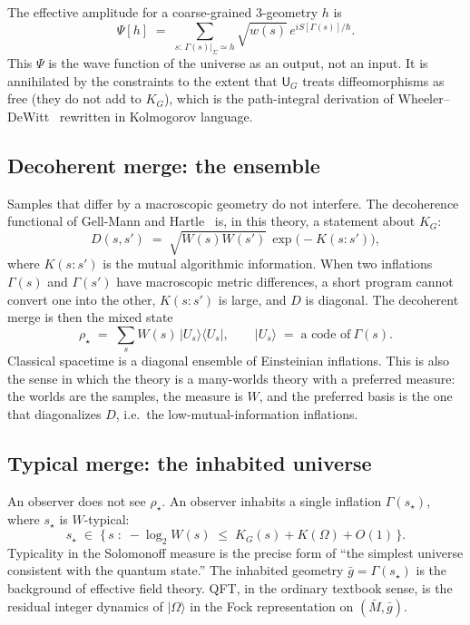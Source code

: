 \documentclass[11pt,a4paper]{article}
\theoremstyle{plain}
\theoremstyle{definition}
\theoremstyle{remark}
\newcommand{\KG}{K_{G}}
\newcommand{\UTM}{\mathsf{U}_{G}}
\newcommand{\ket}[1]{\lvert#1\rangle}
\newcommand{\bra}[1]{\langle#1\rvert}
\begin{document}
The effective amplitude for a coarse-grained $3$-geometry $h$ is
\begin{equation}
  \Psi[h] \;=\; \sum_{s:\,\Gamma(s)|_{\Sigma}\simeq h} \sqrt{w(s)}\, e^{iS[\Gamma(s)]/\hbar}.
  \label{eq:Psi}
\end{equation}
This $\Psi$ is the wave function of the universe as an output, not an input.
It is annihilated by the constraints to the extent that $\UTM$ treats diffeomorphisms as free (they do not add to $\KG$), which is the path-integral derivation of Wheeler--DeWitt~\cite{halliwell1991} rewritten in Kolmogorov language.

\subsection{Decoherent merge: the ensemble}

Samples that differ by a macroscopic geometry do not interfere.
The decoherence functional of Gell-Mann and Hartle~\cite{gellmann1993} is, in this theory, a statement about $\KG$:
\begin{equation}
  D(s,s') \;=\; \sqrt{W(s)W(s')}\, \exp\bigl(-K(s:s')\bigr),
\end{equation}
where $K(s:s')$ is the mutual algorithmic information.
When two inflations $\Gamma(s)$ and $\Gamma(s')$ have macroscopic metric differences, a short program cannot convert one into the other, $K(s:s')$ is large, and $D$ is diagonal.
The decoherent merge is then the mixed state
\begin{equation}
  \rho_{\star} \;=\; \sum_{s} W(s)\, \ket{U_{s}}\bra{U_{s}}, \qquad \ket{U_{s}}\;=\;\text{a code of}\ \Gamma(s).
  \label{eq:rho}
\end{equation}
Classical spacetime is a diagonal ensemble of Einsteinian inflations.
This is also the sense in which the theory is a many-worlds theory with a preferred measure: the worlds are the samples, the measure is $W$, and the preferred basis is the one that diagonalizes $D$, i.e.\ the low-mutual-information inflations.

\subsection{Typical merge: the inhabited universe}

An observer does not see $\rho_{\star}$.
An observer inhabits a single inflation $\Gamma(s_{\star})$, where $s_{\star}$ is $W$-typical:
\begin{equation}
  s_{\star} \;\in\; \bigl\{\,s\;:\; -\log_{2} W(s) \;\le\; \KG(s) + K(\Omega) + O(1)\,\bigr\}.
\end{equation}
Typicality in the Solomonoff measure is the precise form of ``the simplest universe consistent with the quantum state.''
The inhabited geometry $\bar{g}=\Gamma(s_{\star})$ is the background of effective field theory.
QFT, in the ordinary textbook sense, is the residual integer dynamics of $\ket{\Omega}$ in the Fock representation on $(\bar{M},\bar{g})$.
\end{document}

